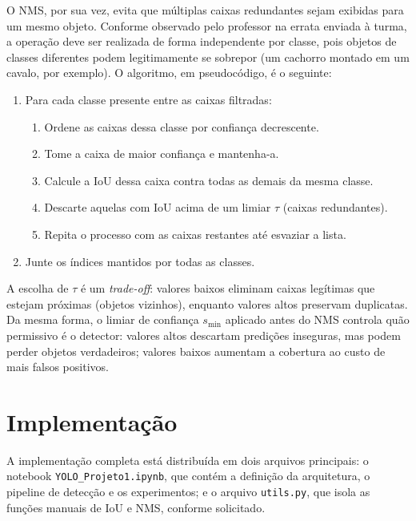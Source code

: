 \documentclass[11pt,a4paper]{article}
\begin{document}
O NMS, por sua vez, evita que múltiplas caixas redundantes sejam exibidas para um mesmo objeto. Conforme observado pelo professor na errata enviada à turma, a operação deve ser realizada de forma independente por classe, pois objetos de classes diferentes podem legitimamente se sobrepor (um cachorro montado em um cavalo, por exemplo). O algoritmo, em pseudocódigo, é o seguinte:

\begin{enumerate}\itemsep0pt
  \item Para cada classe presente entre as caixas filtradas:
  \begin{enumerate}\itemsep0pt
    \item Ordene as caixas dessa classe por confiança decrescente.
    \item Tome a caixa de maior confiança e mantenha-a.
    \item Calcule a IoU dessa caixa contra todas as demais da mesma classe.
    \item Descarte aquelas com IoU acima de um limiar $\tau$ (caixas redundantes).
    \item Repita o processo com as caixas restantes até esvaziar a lista.
  \end{enumerate}
  \item Junte os índices mantidos por todas as classes.
\end{enumerate}

A escolha de $\tau$ é um \emph{trade-off}: valores baixos eliminam caixas legítimas que estejam próximas (objetos vizinhos), enquanto valores altos preservam duplicatas. Da mesma forma, o limiar de confiança $s_{\min}$ aplicado antes do NMS controla quão permissivo é o detector: valores altos descartam predições inseguras, mas podem perder objetos verdadeiros; valores baixos aumentam a cobertura ao custo de mais falsos positivos.

\section{Implementação}

A implementação completa está distribuída em dois arquivos principais: o notebook \texttt{YOLO\_Projeto1.ipynb}, que contém a definição da arquitetura, o pipeline de detecção e os experimentos; e o arquivo \texttt{utils.py}, que isola as funções manuais de IoU e NMS, conforme solicitado.
\end{document}
